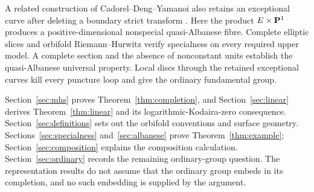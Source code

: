 A related construction of Cadorel--Deng--Yamanoi also retains an
exceptional curve after deleting a boundary strict transform
\cite[Example 4.34]{CDY2025}. Here the product $E\times\mathbf P^1$ produces
a positive-dimensional nonspecial quasi-Albanese fibre. Complete
elliptic slices and orbifold Riemann--Hurwitz verify specialness on
every required upper model. A complete section and the absence of
nonconstant units establish the quasi-Albanese universal property.
Local discs through the retained exceptional curves kill every
puncture loop and give the ordinary fundamental group.

Section~\ref{sec:mhs} proves Theorem~\ref{thm:completion}, and
Section~\ref{sec:linear} derives Theorem~\ref{thm:linear} and its
logarithmic-Kodaira-zero consequence.
Section~\ref{sec:definitions} sets out the orbifold conventions and
surface geometry. Sections~\ref{sec:specialness} and~\ref{sec:albanese}
prove Theorem~\ref{thm:example}; Section~\ref{sec:composition} explains
the composition calculation. Section~\ref{sec:ordinary} records the
remaining ordinary-group question. The representation results do not
assume that the ordinary group embeds in its completion, and no such
embedding is supplied by the argument.
